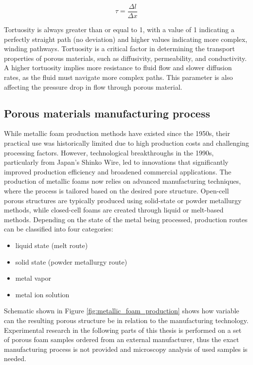 \documentclass[a4paper]{article}
\begin{document}
\begin{equation}
  \tau = \dfrac{\Delta l}{\Delta x}\label{eq:path-tortuosity}
\end{equation}

\noindent Tortuosity is always greater than or equal to 1, with a value of 1 indicating a perfectly straight path (no deviation) and higher values indicating more complex, winding pathways.
Tortuosity is a critical factor in determining the transport properties of porous materials, such as diffusivity, permeability, and conductivity. A higher tortuosity implies more resistance to fluid flow and slower diffusion rates, as the fluid must navigate more complex paths. 
This parameter is also affecting the pressure drop in flow through porous material. 

\pagebreak
\subsection{Porous materials manufacturing process}
While metallic foam production methods have existed since the 1950s, their practical use was historically limited due to high production costs and challenging processing factors. However, technological breakthroughs in the 1990s, particularly from Japan's Shinko Wire, led to innovations that significantly improved production efficiency and broadened commercial applications. 
The production of metallic foams now relies on advanced manufacturing techniques, where the process is tailored based on the desired pore structure. Open-cell porous structures are typically produced using solid-state or powder metallurgy methods, while closed-cell foams are created through liquid or melt-based methods. 
Depending on the state of the metal being processed, production routes can be classified into four categories: 
\begin{itemize}
  \item liquid state (melt route)
  \item solid state (powder metallurgy route)
  \item metal vapor
  \item metal ion solution
\end{itemize}

\noindent Schematic shown in Figure \ref{fig:metallic_foam_production} shows how variable can the resulting porous structure be in relation to the manufacturing technology.
Experimental research in the following parts of this thesis is performed on a set of porous foam samples ordered from an external manufacturer, thus the exact manufacturing process is not provided and microscopy analysis of used samples is needed.
\end{document}
